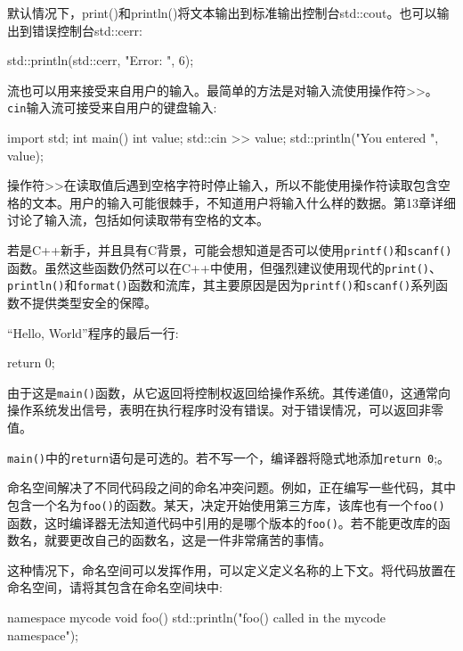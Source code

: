默认情况下，print()和println()将文本输出到标准输出控制台std::cout。也可以输出到错误控制台std::cerr:

\begin{cpp}
std::println(std::cerr, "Error: {}", 6);
\end{cpp}

流也可以用来接受来自用户的输入。最简单的方法是对输入流使用操作符>{}>。\verb|cin|输入流可接受来自用户的键盘输入:

\begin{cpp}
import std;
int main()
{
    int value;
    std::cin >> value;
    std::println("You entered {}", value);
}
\end{cpp}

操作符>{}>在读取值后遇到空格字符时停止输入，所以不能使用操作符读取包含空格的文本。用户的输入可能很棘手，不知道用户将输入什么样的数据。第13章详细讨论了输入流，包括如何读取带有空格的文本。

若是C++新手，并且具有C背景，可能会想知道是否可以使用\verb|printf()|和\verb|scanf()|函数。虽然这些函数仍然可以在C++中使用，但强烈建议使用现代的\verb|print()|、\verb|println()|和\verb|format()|函数和流库，其主要原因是因为\verb|printf()|和\verb|scanf()|系列函数不提供类型安全的保障。


“Hello, World”程序的最后一行:

\begin{cpp}
return 0;
\end{cpp}

由于这是\verb|main()|函数，从它返回将控制权返回给操作系统。其传递值0，这通常向操作系统发出信号，表明在执行程序时没有错误。对于错误情况，可以返回非零值。

\verb|main()|中的\verb|return|语句是可选的。若不写一个，编译器将隐式地添加\verb|return 0|;。


命名空间解决了不同代码段之间的命名冲突问题。例如，正在编写一些代码，其中包含一个名为\verb|foo()|的函数。某天，决定开始使用第三方库，该库也有一个\verb|foo()|函数，这时编译器无法知道代码中引用的是哪个版本的\verb|foo()|。若不能更改库的函数名，就要更改自己的函数名，这是一件非常痛苦的事情。

这种情况下，命名空间可以发挥作用，可以定义定义名称的上下文。将代码放置在命名空间，请将其包含在命名空间块中:

\begin{cpp}
namespace mycode {
    void foo()
    {
        std::println("foo() called in the mycode namespace");
    }
}
\end{cpp}

